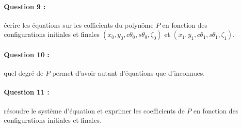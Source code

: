 \documentclass {article}
\begin{document}
\paragraph {Question 9 :} écrire les équations sur les cofficients du polyn\^ome $P$ en fonction des configurations initiales et finales $(x_0,y_0,c\theta_0,s\theta_0,\zeta_0)$ et $(x_1,y_1,c\theta_1,s\theta_1,\zeta_1)$.

\paragraph {Question 10 :} quel degré de $P$ permet d'avoir autant d'équations que d'inconnues.

\paragraph {Question 11 :} résoudre le système d'équation et exprimer les coefficients de $P$ en fonction des configurations initiales et finales.
\end{document}
